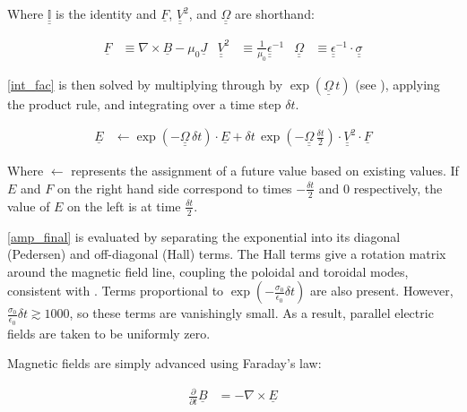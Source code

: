 \documentclass[draft,linenumbers]{agujournal}
\begin{document}
Where $\underline{\underline{ \mathbb{I} }}$ is the identity and $\underline{F}$, $\underline{\underline{V}}^2$, and $\underline{\underline{\Omega}}$ are shorthand:
\begin{linenomath*}
\begin{align}
    \underline{F} &\equiv \nabla \times \underline{B} - \mu_0 \underline{J} &
    \underline{\underline{V}}^2 &\equiv \frac{1}{\mu_0} \underline{\underline{\epsilon}}^{-1} &
    \underline{\underline{\Omega}} &\equiv \underline{\underline{\epsilon}}^{-1} \cdot \underline{\underline{\sigma}}
\end{align}
\end{linenomath*}

\cref{int_fac} is then solved by multiplying through by $\exp \left( \underline{\underline{\Omega}} \, t \right)$ (see \citet{hall_2015}), applying the product rule, and integrating over a time step $\delta \! t$.
\begin{linenomath*}
\begin{align}
    \label{amp_final}
    \underline{E} &\leftarrow \exp \left( -\underline{\underline{\Omega}} \, \delta \! t \right) \cdot \underline{E} +
        \delta \! t \, \exp \left( -\underline{\underline{\Omega}} \, \tfrac{\delta \! t}{2} \right) \cdot
        \underline{\underline{V}}^2 \cdot \underline{F}
\end{align}
\end{linenomath*}

Where $\leftarrow$ represents the assignment of a future value based on existing values. If $E$ and $F$ on the right hand side correspond to times $-\frac{\delta \! t}{2}$ and $0$ respectively, the value of $E$ on the left is at time $\frac{\delta \! t}{2}$.

\cref{amp_final} is evaluated by separating the exponential into its diagonal (Pedersen) and off-diagonal (Hall) terms. The Hall terms give a rotation matrix around the magnetic field line, coupling the poloidal and toroidal modes, consistent with \citet{hughes_1974}. Terms proportional to $\exp \left( - \frac{\sigma_0}{\epsilon_0}\delta \! t \right)$ are also present. However, $\frac{\sigma_0}{\epsilon_0}\delta \! t \gtrsim 1000$, so these terms are vanishingly small. As a result, parallel electric fields are taken to be uniformly zero.

Magnetic fields are simply advanced using Faraday's law:
\begin{linenomath*}
\begin{align}
    \label{far_law}
    \frac{\partial}{\partial t} \underline{B} &= - \nabla \times \underline{E}
\end{align}
\end{linenomath*}
\end{document}
